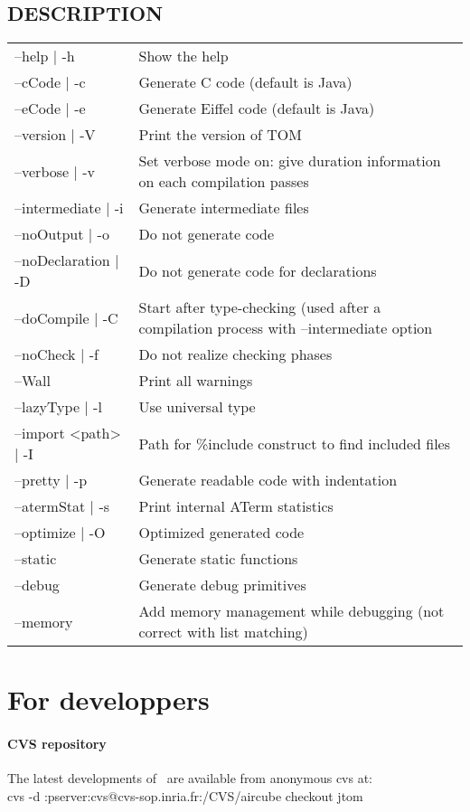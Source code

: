 \subsection{DESCRIPTION}
\begin{tabular}{|l|l|}
\hline
--help | -h&            Show the help \\
--cCode | -c&           Generate C code (default is Java)\\
--eCode | -e&           Generate Eiffel code (default is Java)\\
--version | -V&         Print the version of TOM\\
--verbose | -v&         Set verbose mode on: give duration information
on each compilation passes\\
--intermediate | -i&    Generate intermediate files \\
--noOutput | -o&        Do not generate code \\
--noDeclaration | -D&   Do not generate code for declarations \\
--doCompile | -C&       Start after type-checking (used after a
compilation process with --intermediate option\\
--noCheck | -f&         Do not realize checking phases \\
--Wall&       Print all warnings \\
--lazyType | -l&        Use universal type \\
--import <path> | -I&   Path for \%include construct to find included files\\
--pretty | -p&          Generate readable code with indentation \\
--atermStat | -s&       Print internal ATerm statistics \\
--optimize | -O&        Optimized generated code \\
--static&               Generate static functions \\
--debug&                Generate debug primitives \\
--memory&               Add memory management while debugging (not correct with list matching)\\
\hline
\end{tabular}


\section{For developpers}\label{developpers}
\paragraph{CVS repository}
The latest developments of \TOM\ are available from anonymous cvs at:
\\cvs -d :pserver:cvs@cvs-sop.inria.fr:/CVS/aircube checkout jtom
